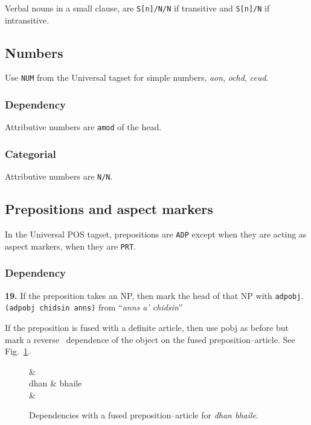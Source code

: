 \documentclass[a4paper]{article}
\begin{document}
 Verbal nouns in a small clause, are \texttt{S[n]/N/N} if transitive and \texttt{S[n]/N} if intransitive.

\subsection{Numbers\label{subsect:numbers}}

Use \texttt{NUM} from the Universal tagset for simple numbers, \textit{aon}, \textit{ochd}, \textit{ceud}.

\subsubsection*{Dependency}

 Attributive numbers are \texttt{amod} of the head.

\subsubsection*{Categorial}

 Attributive numbers are \texttt{N/N}.

\subsection{Prepositions and aspect markers\label{subsect:prepositions}}

In the Universal POS tagset, prepositions are \texttt{ADP} except when they are acting as aspect markers, when they are \texttt{PRT}.

\subsubsection*{Dependency}

{\bf 19.} If the preposition takes an NP, then mark the head of that NP with \texttt{adpobj}. \texttt{(adpobj chidsin anns)} from ``\textit{anns a' chidsin}''

 If the preposition is fused with a definite article, then use pobj as before but mark a reverse \deter\ dependence of the object on the fused preposition--article.
See Fig.~\ref{fig:dhanbhaile}.

\begin{figure}
\begin{center}
\begin{dependency}
\begin{deptext}
\deter \& \\
dhan \& bhaile\\
 \& \adpobj\\\end{deptext}
\end{dependency}
\end{center}
\caption{Dependencies with a fused preposition--article for \textit{dhan bhaile}.\label{fig:dhanbhaile}}
\end{figure}
\end{document}
